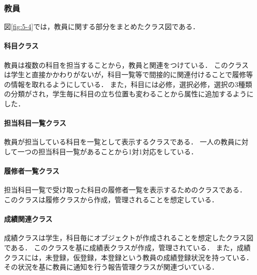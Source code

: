 \documentclass[documentclass]{jsarticle}
\begin{document}
\subsubsection*{教員}
図\ref*{fig:5-4}では，教員に関する部分をまとめたクラス図である．

\paragraph*{科目クラス}
教員は複数の科目を担当することから，教員と関連をつけている．
このクラスは学生と直接かかわりがないが，科目一覧等で間接的に関連付けることで履修等の情報を取れるようにしている．
また，科目には必修，選択必修，選択の3種類の分類がされ，学生毎に科目の立ち位置も変わることから属性に追加するようにした．

\paragraph*{担当科目一覧クラス}
教員が担当している科目を一覧として表示するクラスである．
一人の教員に対して一つの担当科目一覧があることから1対1対応をしている．

\paragraph*{履修者一覧クラス}
担当科目一覧で受け取った科目の履修者一覧を表示するためのクラスである．
このクラスは履修クラスから作成，管理されることを想定している．

\paragraph*{成績関連クラス}
成績クラスは学生，科目毎にオブジェクトが作成されることを想定したクラス図である．
このクラスを基に成績表クラスが作成，管理されている．
また，成績クラスには，未登録，仮登録，本登録という教員の成績登録状況を持っている．
その状況を基に教員に通知を行う報告管理クラスが関連づいている．
\end{document}
